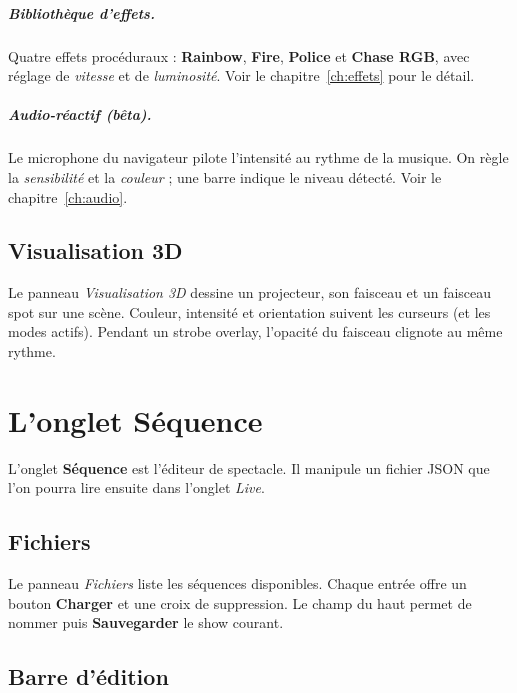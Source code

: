 \paragraph{Bibliothèque d'effets.} Quatre effets procéduraux :
\textbf{Rainbow}, \textbf{Fire}, \textbf{Police} et \textbf{Chase RGB}, avec
réglage de \emph{vitesse} et de \emph{luminosité}. Voir le
chapitre~\ref{ch:effets} pour le détail.

\paragraph{Audio-réactif (bêta).} Le microphone du navigateur pilote
l'intensité au rythme de la musique. On règle la \emph{sensibilité} et la
\emph{couleur} ; une barre indique le niveau détecté. Voir le
chapitre~\ref{ch:audio}.

\section{Visualisation 3D}

Le panneau \emph{Visualisation 3D} dessine un projecteur, son faisceau et un
faisceau spot sur une scène. Couleur, intensité et orientation suivent les
curseurs (et les modes actifs). Pendant un strobe overlay, l'opacité du faisceau
clignote au même rythme.

\chapter{L'onglet Séquence}
\label{ch:sequence-ui}

L'onglet \textbf{Séquence} est l'éditeur de spectacle. Il manipule un fichier
JSON que l'on pourra lire ensuite dans l'onglet \emph{Live}.

\section{Fichiers}

Le panneau \emph{Fichiers} liste les séquences disponibles. Chaque entrée offre
un bouton \textbf{Charger} et une croix  de suppression. Le champ du
haut permet de nommer puis \textbf{Sauvegarder} le show courant.

\section{Barre d'édition}

